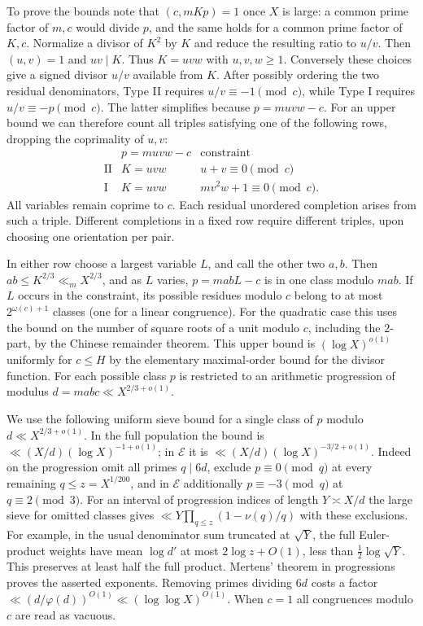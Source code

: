\documentclass[a4paper,11pt]{article}
\begin{document}
To prove the bounds note that $(c,mKp)=1$ once $X$ is large: a
common prime factor of $m,c$ would divide $p$, and the same holds
for a common prime factor of $K,c$. Normalize a divisor of $K^2$
by $K$ and reduce the resulting ratio to $u/v$. Then $(u,v)=1$
and $uv\mid K$. Thus $K=uvw$ with $u,v,w\ge1$. Conversely these
choices give a signed divisor $u/v$ available from $K$. After
possibly ordering the two residual denominators, Type II requires
$u/v\equiv-1\pmod c$, while Type I requires
$u/v\equiv-p\pmod c$. The latter simplifies because
$p=muvw-c$. For an upper bound we can therefore count all triples
satisfying one of the following rows, dropping the coprimality of
$u,v$:
\[
\begin{array}{c|c|c}
 & p=muvw-c &\text{constraint}\\ \hline
\mathrm{II} & K=uvw & u+v\equiv0\pmod c\\
\mathrm{I} & K=uvw & mv^2 w+1\equiv0\pmod c .
\end{array}
\]
All variables remain coprime to $c$. Each residual unordered
completion arises from such a triple. Different completions in a
fixed row require different triples, upon choosing one orientation
per pair.

In either row choose a largest variable $L$, and call the other two
$a,b$. Then $ab\le K^{2/3}\ll_m X^{2/3}$, and as $L$ varies,
$p=mabL-c$ is in one class modulo $mab$. If $L$ occurs in the
constraint, its possible residues modulo $c$ belong to at most
$2^{\omega(c)+1}$ classes (one for a linear congruence). For the
quadratic case this uses the bound on the number of square roots
of a unit modulo $c$, including the $2$-part, by the Chinese remainder
theorem. This upper bound is $(\log X)^{o(1)}$ uniformly for $c\le H$
by the elementary maximal-order bound for the divisor function.
For each possible class $p$ is restricted to an arithmetic
progression of modulus $d=mabc\ll X^{2/3+o(1)}$.

We use the following uniform sieve bound for a single class of $p$
modulo $d\ll X^{2/3+o(1)}$. In the full population the bound is
$\ll(X/d)(\log X)^{-1+o(1)}$; in $\mathcal E$ it is
$\ll(X/d)(\log X)^{-3/2+o(1)}$.
Indeed on the progression omit all primes $q\mid6d$, exclude
$p\equiv0\pmod q$ at every remaining $q\le z=X^{1/200}$,
and in $\mathcal E$ additionally $p\equiv-3\pmod q$ at
$q\equiv2\pmod3$. For an interval of progression indices of
length $Y\asymp X/d$ the large sieve for omitted classes gives
$\ll Y\prod_{q\le z}(1-\nu(q)/q)$ with these exclusions.
For example, in the usual denominator sum truncated at $\sqrt Y$,
the full Euler-product weights have mean $\log d'$ at most
$2\log z+O(1)$, less than $\frac12\log\sqrt Y$.
This preserves at least half the full product. Mertens' theorem in
progressions proves the asserted exponents. Removing primes dividing
$6d$ costs a factor $\ll(d/\varphi(d))^{O(1)}
\ll (\log\log X)^{O(1)}$. When $c=1$ all congruences modulo $c$
are read as vacuous.
\end{document}
